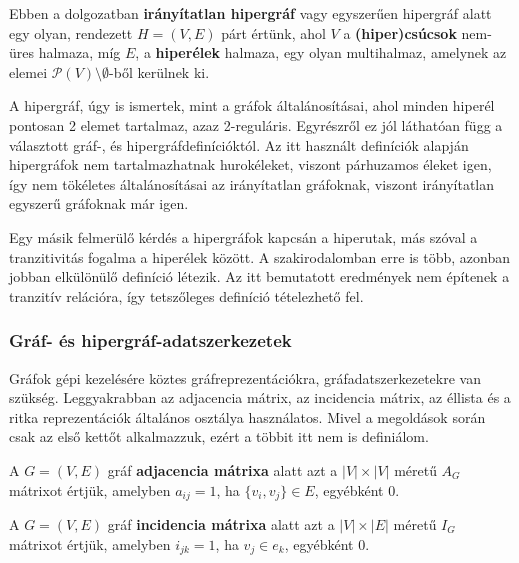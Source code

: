 \begin{definition}
Ebben a dolgozatban \textbf{irányítatlan hipergráf} vagy egyszerűen hipergráf alatt egy olyan, rendezett $H=(V,E)$ párt értünk, ahol $V$ a \textbf{(hiper)csúcsok} nem-üres halmaza, míg $E$, a \textbf{hiperélek} halmaza, egy olyan multihalmaz, amelynek az elemei $\mathcal{P}(V) \setminus \emptyset$-ből kerülnek ki.
\end{definition}

\begin{note}
A hipergráf, úgy is ismertek, mint a gráfok általánosításai, ahol minden hiperél pontosan 2 elemet tartalmaz, azaz 2-reguláris. Egyrészről ez jól láthatóan függ a választott gráf-, és hipergráfdefinícióktól. Az itt használt definíciók alapján hipergráfok nem tartalmazhatnak hurokéleket, viszont párhuzamos éleket igen, így nem tökéletes általánosításai az irányítatlan gráfoknak, viszont irányítatlan egyszerű gráfoknak már igen.
\end{note}

\begin{note}
Egy másik felmerülő kérdés a hipergráfok kapcsán a hiperutak, más szóval a tranzitivitás fogalma a hiperélek között. A szakirodalomban erre is több, azonban jobban elkülönülő definíció létezik. Az itt bemutatott eredmények nem építenek a tranzitív relációra, így tetszőleges definíció tételezhető fel.
\end{note}

\subsubsection{Gráf- és hipergráf-adatszerkezetek} \label{adsDefinitions}

Gráfok gépi kezelésére köztes gráfreprezentációkra, gráfadatszerkezetekre van szükség. Leggyakrabban az adjacencia mátrix, az incidencia mátrix, az éllista és a ritka reprezentációk általános osztálya használatos. Mivel a megoldások során csak az első kettőt alkalmazzuk, ezért a többit itt nem is definiálom.

\begin{definition}
A $G=(V,E)$ gráf \textbf{adjacencia mátrixa} alatt azt a $|V| \times |V|$ méretű $A_G$ mátrixot értjük, amelyben $a_{ij}=1$, ha $\{v_i, v_j\} \in E$, egyébként 0.
\end{definition}

\begin{definition}
A $G=(V,E)$ gráf \textbf{incidencia mátrixa} alatt azt a $|V| \times |E|$ méretű $I_G$ mátrixot értjük, amelyben $i_{jk}=1$, ha $v_j \in e_k$, egyébként 0.
\end{definition}

